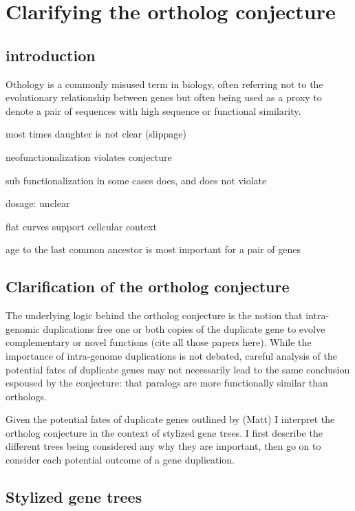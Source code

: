 \chapter{Clarifying the ortholog conjecture}

\section{introduction}

Othology is a commonly misused term in biology, often referring not to the evolutionary relationship between genes but often being used as a proxy to denote a pair of sequences with high sequence or functional similarity.


most times daughter is not clear (slippage)

neofunctionalization violates conjecture

sub functionalization in some cases does, and does not violate

dosage: unclear

flat curves support cellcular context

age to the last common ancestor is most important for a pair of genes


\section{Clarification of the ortholog conjecture}

The underlying logic behind the ortholog conjecture is  the notion that intra-genomic duplications free one or both copies of the duplicate gene to evolve complementary or novel functions (cite all those papers here).  While the importance of intra-genome duplications is not debated, careful analysis of the potential fates of duplicate genes may not necessarily lead to the same conclusion espoused by the conjecture: that paralogs are more functionally similar than orthologs.

Given the potential fates of duplicate genes outlined by (Matt) I  interpret the ortholog conjecture in the context of stylized gene trees.  I first describe the different trees being considered any why they are important, then go on to consider each potential outcome of a gene duplication.

\section{Stylized gene trees}


